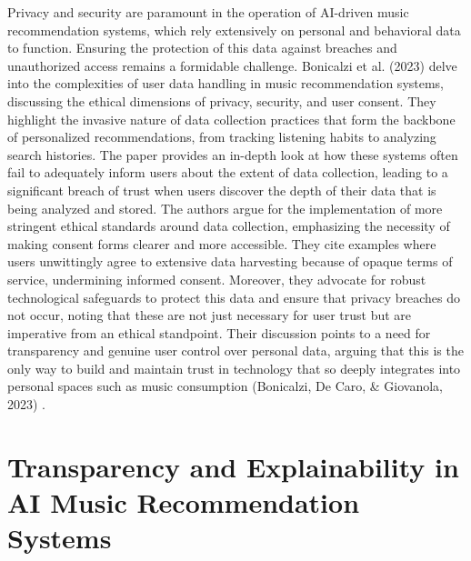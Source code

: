 \documentclass[10pt,twocolumn]{article}
\begin{document}
Privacy and security are paramount in the operation of AI-driven music recommendation systems, which rely extensively on personal and behavioral data to function. Ensuring the protection of this data against breaches and unauthorized access remains a formidable challenge. Bonicalzi et al. (2023) \cite{bonicalzi2023artificial}delve into the complexities of user data handling in music recommendation systems, discussing the ethical dimensions of privacy, security, and user consent. They highlight the invasive nature of data collection practices that form the backbone of personalized recommendations, from tracking listening habits to analyzing search histories. The paper provides an in-depth look at how these systems often fail to adequately inform users about the extent of data collection, leading to a significant breach of trust when users discover the depth of their data that is being analyzed and stored. The authors argue for the implementation of more stringent ethical standards around data collection, emphasizing the necessity of making consent forms clearer and more accessible. They cite examples where users unwittingly agree to extensive data harvesting because of opaque terms of service, undermining informed consent. Moreover, they advocate for robust technological safeguards to protect this data and ensure that privacy breaches do not occur, noting that these are not just necessary for user trust but are imperative from an ethical standpoint. Their discussion points to a need for transparency and genuine user control over personal data, arguing that this is the only way to build and maintain trust in technology that so deeply integrates into personal spaces such as music consumption (Bonicalzi, De Caro, & Giovanola, 2023) \cite{bonicalzi2023artificial}.




\section{Transparency and Explainability in AI Music Recommendation Systems}
\end{document}
